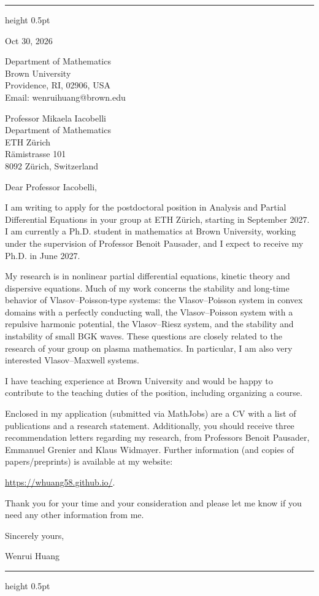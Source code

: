 \documentclass[10pt]{article}
\begin{document}
\vspace{0.08in}
\hrule height 0.5pt

\vspace{0.47in}
\hfill
\begin{minipage}{2.27in}
Oct 30, 2026

\vspace{0.16in}
Department of Mathematics\\
Brown University\\
Providence, RI, 02906, USA\\
Email: wenrui\textunderscore huang@brown.edu
\end{minipage}

\vspace{0.30in}
Professor Mikaela Iacobelli\\
Department of Mathematics\\
ETH Z\"urich\\
R\"amistrasse 101\\
8092 Z\"urich, Switzerland

\vspace{0.16in}
Dear Professor Iacobelli,

I am writing to apply for the postdoctoral position in Analysis and Partial Differential Equations in your group at ETH Z\"urich, starting in September 2027. I am currently a Ph.D. student in mathematics at Brown University, working under the supervision of Professor Benoit Pausader, and I expect to receive my Ph.D. in June 2027.

My research is in nonlinear partial differential equations, kinetic theory and dispersive equations. Much of my work concerns the stability and long-time behavior of Vlasov--Poisson-type systems: the Vlasov--Poisson system in convex domains with a perfectly conducting wall, the Vlasov--Poisson system with a repulsive harmonic potential, the Vlasov--Riesz system, and the stability and instability of small BGK waves. These questions are closely related to the research of your group on plasma mathematics. In particular, I am also very interested  Vlasov--Maxwell systems.

I have teaching experience at Brown University and would be happy to contribute to the teaching duties of the position, including organizing a course.

Enclosed in my application (submitted via MathJobs) are a CV with a list of publications and a research statement. Additionally, you should receive three recommendation letters regarding my research, from Professors Benoit Pausader, Emmanuel Grenier and Klaus Widmayer. Further information (and copies of papers/preprints) is available at my website:

\url{https://whuang58.github.io/}.

 \medskip
Thank you for your time and your consideration and please let me know if you
need any other information from me.

\vspace{0.12in}
Sincerely yours,


Wenrui Huang

\vfill
\hrule height 0.5pt
\end{document}

